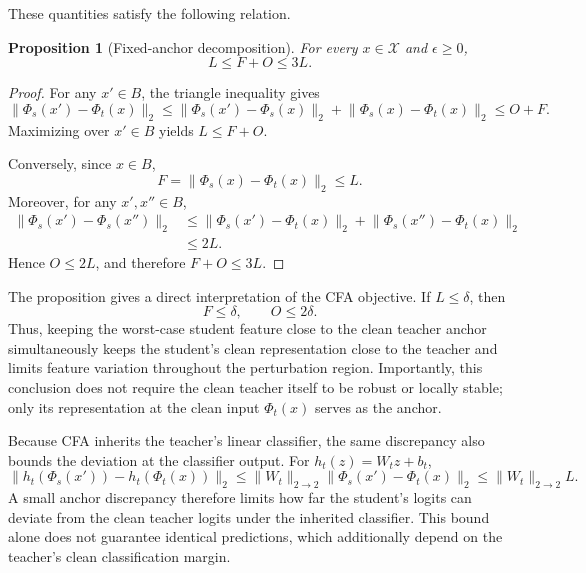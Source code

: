 \documentclass{article} %
\theoremstyle{plain}
\newtheorem{proposition}{Proposition}
\begin{document}
These quantities satisfy the following relation.

\begin{proposition}[Fixed-anchor decomposition]
\label{prop:decomp}
For every \(x\in\mathcal X\) and \(\epsilon\ge0\),
\begin{equation}
L
\le
F+O
\le
3L.
\label{eqn:decomp}
\end{equation}
\end{proposition}

\begin{proof}
For any \(x'\in B\), the triangle inequality gives
\[
\lVert\Phi_s(x')-\Phi_t(x)\rVert_2
\le
\lVert\Phi_s(x')-\Phi_s(x)\rVert_2
+
\lVert\Phi_s(x)-\Phi_t(x)\rVert_2
\le
O+F.
\]
Maximizing over \(x'\in B\) yields \(L\le F+O\).

Conversely, since \(x\in B\),
\[
F
=
\lVert\Phi_s(x)-\Phi_t(x)\rVert_2
\le L.
\]
Moreover, for any \(x',x''\in B\),
\[
\begin{aligned}
\lVert\Phi_s(x')-\Phi_s(x'')\rVert_2
&\le
\lVert\Phi_s(x')-\Phi_t(x)\rVert_2
+
\lVert\Phi_s(x'')-\Phi_t(x)\rVert_2 \\
&\le
2L.
\end{aligned}
\]
Hence \(O\le2L\), and therefore \(F+O\le3L\).
\end{proof}

The proposition gives a direct interpretation of the CFA objective.
If \(L\le\delta\), then
\[
F\le\delta,
\qquad
O\le2\delta.
\]
Thus, keeping the worst-case student feature close to the clean teacher anchor
simultaneously keeps the student's clean representation close to the teacher
and limits feature variation throughout the perturbation region.
Importantly, this conclusion does not require the clean teacher itself to be
robust or locally stable; only its representation at the clean input
\(\Phi_t(x)\) serves as the anchor.

Because CFA inherits the teacher's linear classifier, the same discrepancy
also bounds the deviation at the classifier output.
For \(h_t(z)=W_tz+b_t\),
\begin{equation}
\lVert
h_t(\Phi_s(x'))
-
h_t(\Phi_t(x))
\rVert_2
\le
\lVert W_t\rVert_{2\rightarrow2}
\lVert
\Phi_s(x')-\Phi_t(x)
\rVert_2
\le
\lVert W_t\rVert_{2\rightarrow2}L.
\end{equation}
A small anchor discrepancy therefore limits how far the student's logits can
deviate from the clean teacher logits under the inherited classifier.
This bound alone does not guarantee identical predictions, which additionally
depend on the teacher's clean classification margin.
\end{document}
